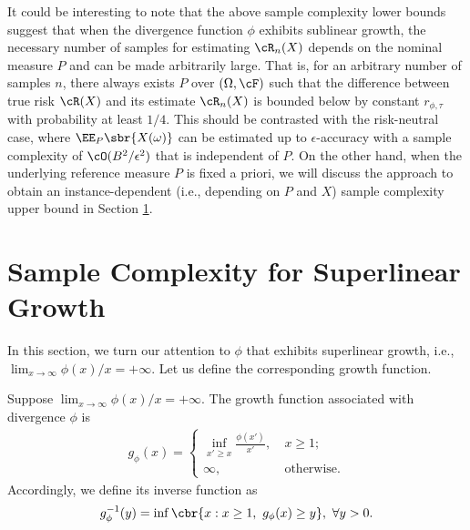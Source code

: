 \documentclass[9pt]{article} %
\numberwithin{equation}{section}
\renewcommand{\frac}[2]{\tfrac{#1}{#2}}
\begin{document}
It could be interesting to note that the above sample complexity lower bounds suggest that when the divergence function $\phi$ exhibits sublinear growth,  the necessary number of samples for estimating $\cR_n(X)$ depends on the nominal measure $P$ and can be  made arbitrarily large.
That is, for an arbitrary number of samples $n$, there always exists $P$ over $(\Omega, \cF)$ such that the difference between true risk $\cR(X)$ and its estimate $\cR_n(X)$ is bounded below by constant $r_{\phi, \tau}$ with probability at least $1/4$. 
This should be contrasted with the risk-neutral case, where $\EE_P \sbr{X(\omega)}$ can be estimated up to $\epsilon$-accuracy with a sample complexity of $\cO(B^2/\epsilon^2)$ that is independent of  $P$.
On the other hand, when the underlying reference measure $P$ is fixed a priori, we will discuss the approach to obtain an instance-dependent (i.e., depending on $P$ and $X$) sample complexity upper bound in Section \ref{sec_suplinear}.





\section{Sample Complexity for Superlinear Growth}\label{sec_suplinear}


In this section, we turn our attention to $\phi$ that exhibits superlinear growth, i.e., $\lim_{x \to \infty} \phi(x) / x = +\infty$.
Let us define the corresponding growth function.

\begin{definition}\label{def_growth}
Suppose $\lim_{x \to \infty} \phi(x) / x = +\infty$.
The growth function associated with divergence $\phi$ is 
\begin{align}\label{def_growth_function}
g_\phi(x) = \begin{cases}  \inf_{x' \geq x} \frac{\phi(x')}{x'}, ~ & x \geq 1; 
\\
\infty, ~ & \text{otherwise}.
\end{cases}
\end{align}
Accordingly, we define its inverse function as 
\begin{align}\label{inverse_g_def}
g_{\phi}^{-1} (y) = \inf \cbr{x: x \geq 1, ~ g_\phi(x) \geq y}, ~ \forall y > 0.
\end{align}
\end{definition}
\end{document}
